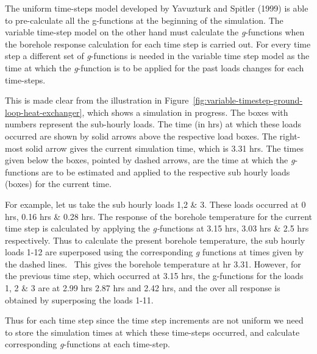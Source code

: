 The uniform time-steps model developed by Yavuzturk and Spitler (1999) is able to pre-calculate all the g-functions at the beginning of the simulation. The variable time-step model on the other hand must calculate the \emph{g}-functions when the borehole response calculation for each time step is carried out. For every time step a different set of \emph{g}-functions is needed in the variable time step model as the time at which the \emph{g}-function is to be applied for the past loads changes for each time-steps.

This is made clear from the illustration in Figure~\ref{fig:variable-timestep-ground-loop-heat-exchanger}, which shows a simulation in progress. The boxes with numbers represent the sub-hourly loads. The time (in hrs) at which these loads occurred are shown by solid arrows above the respective load boxes. The right-most solid arrow gives the current simulation time, which is 3.31 hrs. The times given below the boxes, pointed by dashed arrows, are the time at which the \emph{g}-functions are to be estimated and applied to the respective sub hourly loads (boxes) for the current time.

For example, let us take the sub hourly loads 1,2 \& 3. These loads occurred at 0 hrs, 0.16 hrs \& 0.28 hrs. The response of the borehole temperature for the current time step is calculated by applying the \emph{g­-}functions at 3.15 hrs, 3.03 hrs \& 2.5 hrs respectively. Thus to calculate the present borehole temperature, the sub hourly loads 1-12 are superposed using the corresponding \emph{g} functions at times given by the dashed lines.~ This gives the borehole temperature at hr 3.31. However, for the previous time step, which occurred at 3.15 hrs, the g-functions for the loads 1, 2 \& 3 are at 2.99 hrs 2.87 hrs and 2.42 hrs, and the over all response is obtained by superposing the loads 1-11.

Thus for each time step since the time step increments are not uniform we need to store the simulation times at which these time-steps occurred, and calculate corresponding \emph{g}-functions at each time-step.

